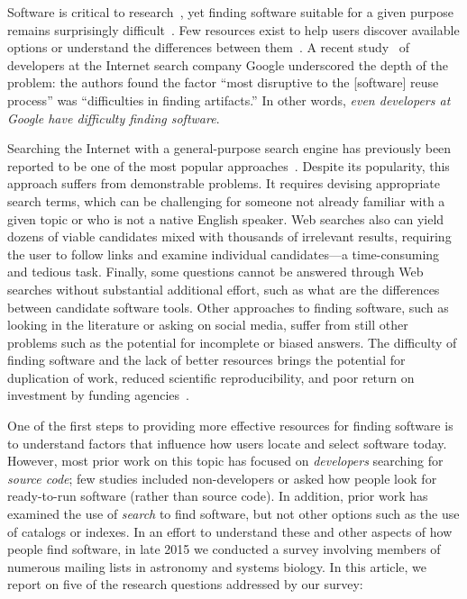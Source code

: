 \documentclass[review]{elsarticle}
\begin{document}
Software is critical to research~\citep{stewart2013initial, howison2015software, howison2015understanding, ince2012case, morin_2012, hettrick_2014, hannay_2009, wilson_2006, katz2016report, katz2015looking}, yet finding software suitable for a given purpose remains surprisingly difficult~\citep{howison2015software, cannata_2005, Bourne::2015, white2014nih}.  Few resources exist to help users discover available options or understand the differences between them~\citep{white2014nih}.  A recent study~\citep{bauer2014exploratory} of developers at the Internet search company Google underscored the depth of the problem: the authors found the factor ``most disruptive to the [software] reuse process'' was ``difficulties in finding artifacts.''  In other words, \emph{even developers at Google have difficulty finding software}.

Searching the Internet with a general-purpose search engine has previously been reported to be one of the most popular approaches~\citep{samadi_2004, umarji_2008}.  Despite its popularity, this approach suffers from demonstrable problems.  It requires devising appropriate search terms, which can be challenging for someone not already familiar with a given topic or who is not a native English speaker.  Web searches also can yield dozens of viable candidates mixed with thousands of irrelevant results, requiring the user to follow links and examine individual candidates---a time-consuming and tedious task.  Finally, some questions cannot be answered through Web searches without substantial additional effort, such as what are the differences between candidate software tools.  Other approaches to finding software, such as looking in the literature or asking on social media, suffer from still other problems such as the potential for incomplete or biased answers.  The difficulty of finding software and the lack of better resources brings the potential for duplication of work, reduced scientific reproducibility, and poor return on investment by funding agencies~\citep{cannata_2005, national2003sharing, crook2013learning, poisot2015best, white2014nih, niemeyer2016challenge}.

One of the first steps to providing more effective resources for finding software is to understand factors that influence how users locate and select software today.  However, most prior work on this topic has focused on \emph{developers} searching for \emph{source code}; few studies included non-developers or asked how people look for ready-to-run software (rather than source code).  In addition, prior work has examined the use of \emph{search} to find software, but not other options such as the use of catalogs or indexes.  In an effort to understand these and other aspects of how people find software, in late 2015 we conducted a survey involving members of numerous mailing lists in astronomy and systems biology.  In this article, we report on five of the research questions addressed by our survey:
\end{document}
